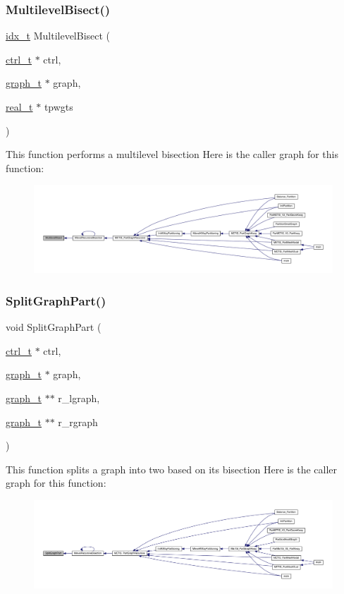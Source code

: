 \subsubsection{\texorpdfstring{Multilevel\+Bisect()}{MultilevelBisect()}}
{\footnotesize\ttfamily \hyperlink{a00876_aaa5262be3e700770163401acb0150f52}{idx\+\_\+t} Multilevel\+Bisect (\begin{DoxyParamCaption}\item[{\hyperlink{a00742}{ctrl\+\_\+t} $\ast$}]{ctrl,  }\item[{\hyperlink{a00734}{graph\+\_\+t} $\ast$}]{graph,  }\item[{\hyperlink{a00876_a1924a4f6907cc3833213aba1f07fcbe9}{real\+\_\+t} $\ast$}]{tpwgts }\end{DoxyParamCaption})}

This function performs a multilevel bisection Here is the caller graph for this function\+:\nopagebreak
\begin{figure}[H]
\begin{center}
\leavevmode
\includegraphics[width=350pt]{a00260_a33c48a23cc94ea0221fa5c7317cd0222_icgraph}
\end{center}
\end{figure}
\mbox{\label{a00260_a49d272affb67ce57b2d20dccd7f15f53}} 
\subsubsection{\texorpdfstring{Split\+Graph\+Part()}{SplitGraphPart()}}
{\footnotesize\ttfamily void Split\+Graph\+Part (\begin{DoxyParamCaption}\item[{\hyperlink{a00742}{ctrl\+\_\+t} $\ast$}]{ctrl,  }\item[{\hyperlink{a00734}{graph\+\_\+t} $\ast$}]{graph,  }\item[{\hyperlink{a00734}{graph\+\_\+t} $\ast$$\ast$}]{r\+\_\+lgraph,  }\item[{\hyperlink{a00734}{graph\+\_\+t} $\ast$$\ast$}]{r\+\_\+rgraph }\end{DoxyParamCaption})}

This function splits a graph into two based on its bisection Here is the caller graph for this function\+:\nopagebreak
\begin{figure}[H]
\begin{center}
\leavevmode
\includegraphics[width=350pt]{a00260_a49d272affb67ce57b2d20dccd7f15f53_icgraph}
\end{center}
\end{figure}
